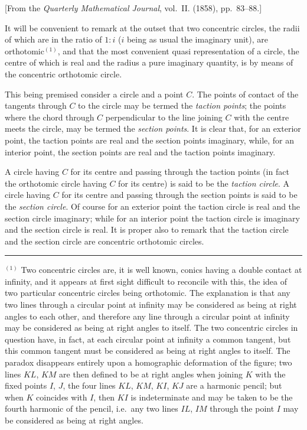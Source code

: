 \documentclass[12pt,a4paper]{article}
\theoremstyle{plain}
\theoremstyle{definition}
\begin{document}
[From the \textit{Quarterly Mathematical Journal}, vol.~II. (1858), pp.~83--88.]

It will be convenient to remark at the outset that two concentric circles, the radii of which are in the ratio of $1 : i$ ($i$ being as usual the imaginary unit), are orthotomic$^{(1)}$, and that the most convenient quasi representation of a circle, the centre of which is real and the radius a pure imaginary quantity, is by means of the concentric orthotomic circle.

This being premised consider a circle and a point $C$. The points of contact of the tangents through $C$ to the circle may be termed the \textit{taction points}; the points where the chord through $C$ perpendicular to the line joining $C$ with the centre meets the circle, may be termed the \textit{section points}. It is clear that, for an exterior point, the taction points are real and the section points imaginary, while, for an interior point, the section points are real and the taction points imaginary.

A circle having $C$ for its centre and passing through the taction points (in fact the orthotomic circle having $C$ for its centre) is said to be the \textit{taction circle}. A circle having $C$ for its centre and passing through the section points is said to be the \textit{section circle}. Of course for an exterior point the taction circle is real and the section circle imaginary; while for an interior point the taction circle is imaginary and the section circle is real. It is proper also to remark that the taction circle and the section circle are concentric orthotomic circles.

\rule{0.5\textwidth}{0.4pt}

$^{(1)}$ Two concentric circles are, it is well known, conics having a double contact at infinity, and it appears at first sight difficult to reconcile with this, the idea of two particular concentric circles being orthotomic. The explanation is that any two lines through a circular point at infinity may be considered as being at right angles to each other, and therefore any line through a circular point at infinity may be considered as being at right angles to itself. The two concentric circles in question have, in fact, at each circular point at infinity a common tangent, but this common tangent must be considered as being at right angles to itself. The paradox disappears entirely upon a homographic deformation of the figure; two lines $KL$, $KM$ are then defined to be at right angles when joining $K$ with the fixed points $I$, $J$, the four lines $KL$, $KM$, $KI$, $KJ$ are a harmonic pencil; but when $K$ coincides with $I$, then $KI$ is indeterminate and may be taken to be the fourth harmonic of the pencil, i.e.\ any two lines $IL$, $IM$ through the point $I$ may be considered as being at right angles.
\end{document}
